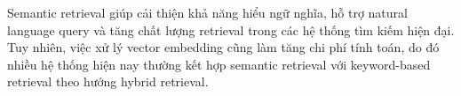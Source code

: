 Semantic retrieval giúp cải thiện khả năng hiểu ngữ nghĩa, hỗ trợ natural language query và tăng chất lượng retrieval trong các hệ thống tìm kiếm hiện đại. Tuy nhiên, việc xử lý vector embedding cũng làm tăng chi phí tính toán, do đó nhiều hệ thống hiện nay thường kết hợp semantic retrieval với keyword-based retrieval theo hướng hybrid retrieval.










